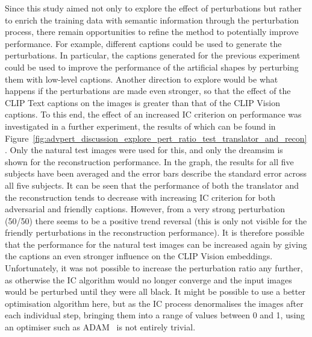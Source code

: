 Since this study aimed not only to explore the effect of perturbations but rather to enrich the training data with semantic information through the perturbation process, there remain opportunities to refine the method to potentially improve performance. For example, different captions could be used to generate the perturbations. In particular, the captions generated for the previous experiment could be used to improve the performance of the artificial shapes by perturbing them with low-level captions. Another direction to explore would be what happens if the perturbations are made even stronger, so that the effect of the CLIP Text captions on the images is greater than that of the CLIP Vision captions. To this end, the effect of an increased IC criterion on performance was investigated in a further experiment, the results of which can be found in Figure~\ref{fig:advpert_discussion_explore_pert_ratio_test_translator_and_recon}. Only the natural test images were used for this, and only the dreamsim is shown for the reconstruction performance. In the graph, the results for all five subjects have been averaged and the error bars describe the standard error across all five subjects. It can be seen that the performance of both the translator and the reconstruction tends to decrease with increasing IC criterion for both adversarial and friendly captions. However, from a very strong perturbation (50/50) there seems to be a positive trend reversal (this is only not visible for the friendly perturbations in the reconstruction performance). It is therefore possible that the performance for the natural test images can be increased again by giving the captions an even stronger influence on the CLIP Vision embeddings. Unfortunately, it was not possible to increase the perturbation ratio any further, as otherwise the IC algorithm would no longer converge and the input images would be perturbed until they were all black. It might be possible to use a better optimisation algorithm here, but as the IC process denormalises the images after each individual step, bringing them into a range of values between 0 and 1, using an optimiser such as ADAM~\cite{kingmaAdamMethodStochastic2017} is not entirely trivial.

